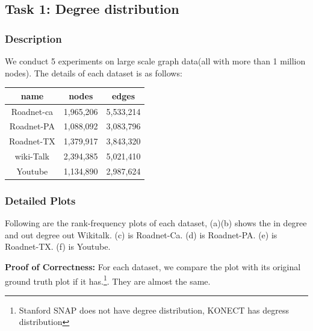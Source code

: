 \subsection{Task 1: Degree distribution}

\subsubsection{Description}
We conduct 5 experiments on large scale graph data(all with more than 1 million nodes). The details of each dataset is as follows: \\

\begin{center}
\begin{tabular}{| c | c | c |}
    \hline
    name & nodes & edges \\ \hline
    Roadnet-ca & 1,965,206 & 5,533,214 \\ \hline
    Roadnet-PA & 1,088,092 & 3,083,796 \\ \hline
    Roadnet-TX & 1,379,917 & 3,843,320 \\ \hline
    wiki-Talk & 2,394,385 & 5,021,410 \\ \hline
    Youtube & 1,134,890 & 2,987,624 \\ \hline
\end{tabular}
\end{center}

\subsubsection{Detailed Plots}
Following are the rank-frequency plots of each dataset, (a)(b) shows the in degree and out degree out Wikitalk. (c) is Roadnet-Ca. (d) is Roadnet-PA. (e) is Roadnet-TX. (f) is Youtube. 

{\bf Proof of Correctness:} For each dataset, we compare the plot with its original ground truth plot if it has.\footnote{Stanford SNAP does not have degree distribution, KONECT has degress distribution}. They are almost the same. 

